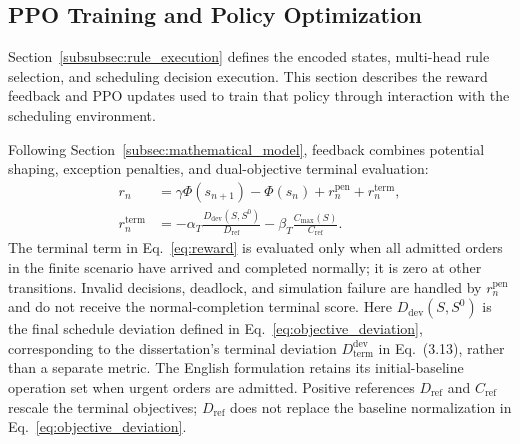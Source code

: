 \subsection{PPO Training and Policy Optimization}
\label{subsec:ppo_policy}
Section~\ref{subsubsec:rule_execution} defines the encoded states, multi-head rule selection,
and scheduling decision execution. This section describes the reward feedback and PPO updates
used to train that policy through interaction with the scheduling environment.

Following Section~\ref{subsec:mathematical_model}, feedback combines potential shaping, exception penalties,
and dual-objective terminal evaluation:
\begin{equation}
 \begin{aligned}
 r_n&=\gamma\Phi(s_{n+1})-\Phi(s_n)+r_n^{\mathrm{pen}}+r_n^{\mathrm{term}},
 \\
 r_n^{\mathrm{term}}&=-\alpha_T\frac{D_{\mathrm{dev}}(S,S^0)}{D_{\mathrm{ref}}}
 -\beta_T\frac{C_{\max}(S)}{C_{\mathrm{ref}}}.
 \end{aligned}
 \label{eq:reward}
\end{equation}
The terminal term in Eq.~\eqref{eq:reward} is evaluated only when all admitted orders in the
finite scenario have arrived and completed normally; it is zero at other transitions.
Invalid decisions, deadlock, and simulation failure are handled by $r_n^{\mathrm{pen}}$ and do
not receive the normal-completion terminal score. Here $D_{\mathrm{dev}}(S,S^0)$ is the final
schedule deviation defined in Eq.~\eqref{eq:objective_deviation}, corresponding to the dissertation's
terminal deviation $D_{\mathrm{term}}^{\mathrm{dev}}$ in Eq.~(3.13), rather than a separate metric.
The English formulation retains its initial-baseline operation set when urgent orders are admitted.
Positive references $D_{\mathrm{ref}}$ and $C_{\mathrm{ref}}$ rescale the terminal objectives;
$D_{\mathrm{ref}}$ does not replace the baseline normalization in Eq.~\eqref{eq:objective_deviation}.

